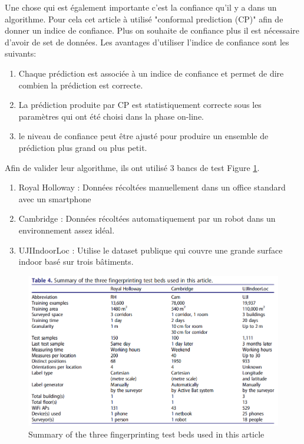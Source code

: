 Une chose qui est également importante c'est la confiance qu'il y a dans un algorithme. Pour cela cet article à utilisé "conformal prediction (CP)" afin de donner un indice de confiance. Plus on souhaite de confiance plus il est nécessaire d'avoir de set de données. Les avantages d'utiliser l'indice de confiance sont les suivants:

\begin{enumerate}
	\item Chaque prédiction est associée à un indice de confiance et permet de dire combien la prédiction est correcte. 
	\item La prédiction produite par CP est statistiquement correcte sous les paramètres qui ont été choisi dans la phase on-line.
	\item le niveau de confiance peut être ajusté pour produire un ensemble de prédiction plus grand ou plus petit.
\end{enumerate}

Afin de valider leur algorithme, ils ont utilisé 3 bancs de test Figure \ref{fig:TestBed}. 

\begin{enumerate}
	\item Royal Holloway : Données récoltées manuellement dans un office standard avec un smartphone
	\item Cambridge : Données récoltées automatiquement par un robot dans un environnement assez idéal.
	\item UJIIndoorLoc : Utilise le dataset publique qui couvre une grande surface indoor basé sur trois bâtiments.
\end{enumerate}

\begin{figure}[htp]
	\begin{center}
		\includegraphics[scale=0.5]{figures/TestBed.png}
		\caption{Summary of the three fingerprinting test beds used in this article \cite{CP_RSS}}
		\label{fig:TestBed} %
	\end{center}
\end{figure}

